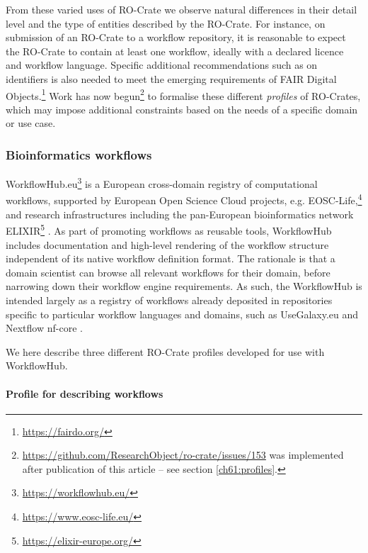 From these varied uses of RO-Crate we observe natural differences in
their detail level and the type of entities described by the RO-Crate.
For instance, on submission of an RO-Crate to a workflow repository, it
is reasonable to expect the RO-Crate to contain at least one workflow,
ideally with a declared licence and workflow language. Specific
additional recommendations such as on identifiers is also needed to meet
the emerging requirements of FAIR Digital
Objects.\footnote{\url{https://fairdo.org/}} Work has now
begun\footnote{\url{https://github.com/ResearchObject/ro-crate/issues/153} was implemented after publication of this article -- see section \vref{ch61:profiles}.} to
formalise these different \textit{profiles} of RO-Crates, which may impose
additional constraints based on the needs of a specific domain or use case.


\subsubsection{Bioinformatics workflows}\label{ch5:workflows}

WorkflowHub.eu\footnote{\url{https://workflowhub.eu/}} is a European cross-domain
registry of computational workflows, supported by European Open Science
Cloud projects, e.g. EOSC-Life,\footnote{\url{https://www.eosc-life.eu/}} and
research infrastructures including the pan-European bioinformatics
network ELIXIR\footnote{\url{https://elixir-europe.org/}}
\cite{Crosswell 2012}. As part
of promoting workflows as reusable tools, WorkflowHub includes
documentation and high-level rendering of the workflow structure
independent of its native workflow definition format. The rationale is
that a domain scientist can browse all relevant workflows for their
domain, before narrowing down their workflow engine requirements. As
such, the WorkflowHub is intended largely as a registry of workflows
already deposited in repositories specific to particular workflow
languages and domains, such as UseGalaxy.eu
\cite{Baker 2020} and
Nextflow nf-core
\cite{Ewels 2020}.

We here describe three different RO-Crate profiles developed for use
with WorkflowHub.

\paragraph{Profile for describing workflows}
\label{ch5:profile-for-describing-workflows}

